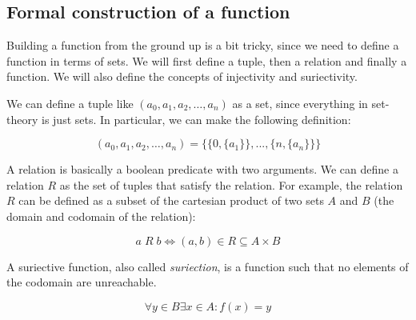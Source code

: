 \subsection{Formal construction of a function}
Building a function from the ground up is a bit tricky, since we need to define a function in terms of sets. We 
will first define a tuple, then a relation and finally a function. We will also define the concepts of injectivity and suriectivity.

\begin{definition}[Tuple]
We can define a tuple like $(a_0, a_1, a_2, \ldots, a_n)$ as a set, since everything 
in set-theory is just sets. In particular, we can make the following definition:

$$ (a_0, a_1, a_2, \ldots, a_n) = \{ \{0, \{a_1\}\}, ..., \{n, \{a_n\}\} \}$$
\end{definition}

\begin{definition}[Relation]
A relation is basically a boolean predicate with two arguments. We can define a relation
$R$ as the set of tuples that satisfy the relation. For example, the relation $R$ 
can be defined as a subset of the cartesian product of two sets $A$ and $B$ (the domain and codomain of the relation):

$$ a\;R\;b \iff (a,b) \in R \subseteq A \times B $$
\end{definition}


\begin{definition}[Suriection]
A suriective function, also called \emph{suriection}, is a function such that no elements of the codomain are unreachable.
    
$$ \forall y \in B \exists x \in A : f(x) = y $$
\end{definition}
    
\newpage